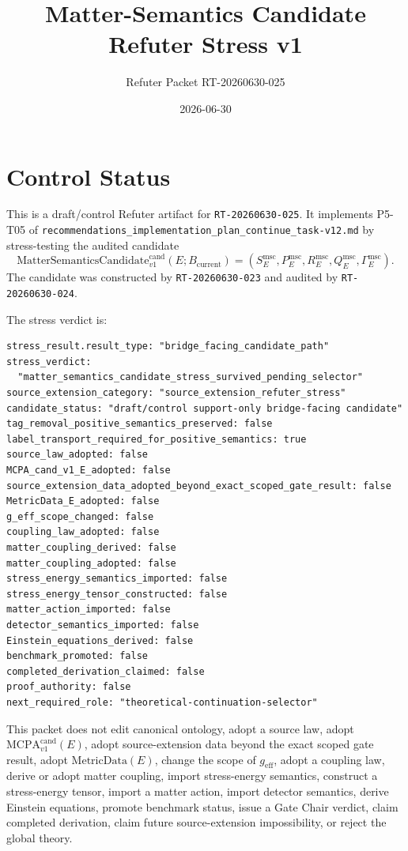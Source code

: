 \documentclass[11pt]{article}
\title{Matter-Semantics Candidate Refuter Stress v1}
\author{Refuter Packet RT-20260630-025}
\date{2026-06-30}
\newcommand{\MetricData}{\mathrm{MetricData}}
\newcommand{\geff}{g_{\mathrm{eff}}}
\newcommand{\MCPA}{\mathrm{MCPA}^{\mathrm{cand}}_{v1}}
\newcommand{\Bcur}{B_{\mathrm{current}}}
\newcommand{\MSCand}{\mathrm{MatterSemanticsCandidate}^{\mathrm{cand}}_{v1}}
\begin{document}
\maketitle

\section{Control Status}

This is a draft/control Refuter artifact for \texttt{RT-20260630-025}. It
implements P5-T05 of
\texttt{recommendations\_implementation\_plan\_continue\_task-v12.md} by
stress-testing the audited candidate
\[
  \MSCand(E;\Bcur)
  = (S_E^{\mathrm{msc}},P_E^{\mathrm{msc}},R_E^{\mathrm{msc}},
     Q_E^{\mathrm{msc}},\Gamma_E^{\mathrm{msc}}).
\]
The candidate was constructed by \texttt{RT-20260630-023} and audited by
\texttt{RT-20260630-024}.

The stress verdict is:
\begin{verbatim}
stress_result.result_type: "bridge_facing_candidate_path"
stress_verdict:
  "matter_semantics_candidate_stress_survived_pending_selector"
source_extension_category: "source_extension_refuter_stress"
candidate_status: "draft/control support-only bridge-facing candidate"
tag_removal_positive_semantics_preserved: false
label_transport_required_for_positive_semantics: true
source_law_adopted: false
MCPA_cand_v1_E_adopted: false
source_extension_data_adopted_beyond_exact_scoped_gate_result: false
MetricData_E_adopted: false
g_eff_scope_changed: false
coupling_law_adopted: false
matter_coupling_derived: false
matter_coupling_adopted: false
stress_energy_semantics_imported: false
stress_energy_tensor_constructed: false
matter_action_imported: false
detector_semantics_imported: false
Einstein_equations_derived: false
benchmark_promoted: false
completed_derivation_claimed: false
proof_authority: false
next_required_role: "theoretical-continuation-selector"
\end{verbatim}

This packet does not edit canonical ontology, adopt a source law, adopt
\(\MCPA(E)\), adopt source-extension data beyond the exact scoped gate result,
adopt \(\MetricData(E)\), change the scope of \(\geff\), adopt a coupling law,
derive or adopt matter coupling, import stress-energy semantics, construct a
stress-energy tensor, import a matter action, import detector semantics,
derive Einstein equations, promote benchmark status, issue a Gate Chair
verdict, claim completed derivation, claim future source-extension
impossibility, or reject the global theory.
\end{document}
